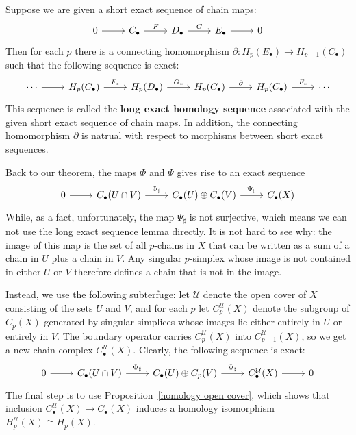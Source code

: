 \begin{lemma}
Suppose we are given a short exact sequence of chain maps:
\[\begin{tikzcd}
0\ar[r]&C_\bullet\ar[r,"F"]&D_\bullet\ar[r,"G"]&E_\bullet\ar[r]&0
\end{tikzcd}\]
Then for each $p$ there is a connecting homomorphism $\partial:H_p(E_\bullet)\to H_{p-1}(C_\bullet)$ such that the following sequence is exact:
\[\begin{tikzcd}
\cdots\ar[r]&H_p(C_\bullet)\ar[r,"F_*"]&H_p(D_\bullet)\ar[r,"G_*"]&H_p(C_\bullet)\ar[r,"\partial"]&H_p(C_\bullet)\ar[r,"F_*"]&\cdots
\end{tikzcd}\]
This sequence is called the \textbf{long exact homology sequence} associated with the given short exact sequence of chain maps. In addition, the connecting homomorphism $\partial$ is natrual with respect to morphisms between short exact sequences.
\end{lemma}
Back to our theorem, the maps $\Phi$ and $\Psi$ gives rise to an exact sequence
\[\begin{tikzcd}
0\ar[r]&C_\bullet(U\cap V)\ar[r,"\Phi_\sharp"]&C_\bullet(U)\oplus C_\bullet(V)\ar[r,"\Psi_\sharp"]&C_\bullet(X)
\end{tikzcd}\]
While, as a fact, unfortunately, the map $\Psi_\sharp$ is not surjective, which means we can not use the long exact sequence lemma directly. It is not hard to see why: the image of this map is the set of all $p$-chains in $X$ that can be written as a sum of a chain in $U$ plus a chain in $V$. Any singular $p$-simplex whose image is not contained in either $U$ or $V$ therefore defines a chain that is not in the image.\par
Instead, we use the following subterfuge: let $\mathcal{U}$ denote the open cover of $X$ consisting of the sets $U$ and $V$, and for each $p$ let $C^\mathcal{U}_p(X)$ denote the subgroup of $C_p(X)$ generated by singular simplices whose images lie either entirely in $U$ or entirely
in $V$. The boundary operator carries $C^\mathcal{U}_p(X)$ into $C^\mathcal{U}_{p-1}(X)$, so we get a new chain complex $C^\mathcal{U}_\bullet(X)$. Clearly, the following sequence is exact:
\[\begin{tikzcd}
0\ar[r]&C_\bullet(U\cap V)\ar[r,"\Phi_\sharp"]&C_\bullet(U)\oplus C_p(V)\ar[r,"\Psi_\sharp"]&C^\mathcal{U}_\bullet(X)\ar[r]&0
\end{tikzcd}\]
The final step is to use Proposition~\ref{homology open cover}, which shows that inclusion $C^\mathcal{U}_\bullet(X)\to C_\bullet(X)$ induces a homology isomorphism $H_p^\mathcal{U}(X)\cong H_p(X)$.
